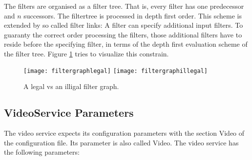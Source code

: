 The filters are organised as a filter tree. That is, every filter has
one predecessor and $n$ successors. The filtertree is processed in
depth first order. This scheme is extended by so called filter
links: A filter can specify additional input filters. To guaranty the
correct order processing the filters, those additional filters have to
reside before the specifying filter, in terms of the depth first
evaluation scheme of the filter tree. Figure \ref{fig:legalIlligal}
tries to visualize this constrain.

\begin{figure}[!ht]
  \begin{center}
    \texttt{[image: filtergraphlegal]}
    \texttt{[image: filtergraphillegal]}
  \end{center}
\caption{A legal vs an illigal filter graph.}
\label{fig:legalIlligal}
\end{figure}

\subsection{VideoService Parameters}

The video service expects its configuration parameters with the
section Video of the configuration file. Its parameter is
also called Video. The
video service has the following parameters:

